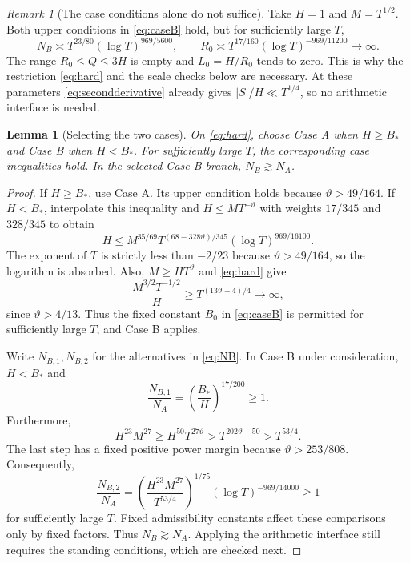 \documentclass[11pt,reqno]{amsart}
\numberwithin{equation}{section}
\newtheorem{lemma}[lemma]{Lemma}
\theoremstyle{definition}
\theoremstyle{remark}
\newtheorem{remark}[remark]{Remark}
\newcommand{\vth}{\vartheta}
\begin{document}
\begin{remark}[The case conditions alone do not suffice]\label{rem:casecounterexample}
Take $H=1$ and $M=T^{1/2}$. Both upper conditions in \eqref{eq:caseB} hold, but for sufficiently large $T$,
\[
 N_B\asymp T^{23/80}(\log T)^{969/5600},\qquad
 R_0\asymp T^{17/160}(\log T)^{-969/11200}\longrightarrow\infty.
\]
The range $R_0\le Q\le3H$ is empty and $L_0=H/R_0$ tends to zero. This is why the restriction \eqref{eq:hard} and the scale checks below are necessary.
At these parameters \eqref{eq:secondderivative} already gives $|S|/H\ll T^{1/4}$, so no arithmetic interface is needed.
\end{remark}

\begin{lemma}[Selecting the two cases]\label{lem:caseselection}
On \eqref{eq:hard}, choose Case A when $H\ge B_*$ and Case B when $H<B_*$. For sufficiently large $T$, the corresponding case inequalities hold. In the selected Case B branch, $N_B\gtrsim N_A$.
\end{lemma}
\begin{proof}
If $H\ge B_*$, use Case A.
Its upper condition holds because $\vth>49/164$.
If $H<B_*$, interpolate this inequality and $H\le MT^{-\vth}$ with weights $17/345$ and $328/345$ to obtain
\begin{equation}\label{eq:caseBinterpolation}
 H\le M^{35/69}T^{(68-328\vth)/345}(\log T)^{969/16100}.
\end{equation}
The exponent of $T$ is strictly less than $-2/23$ because $\vth>49/164$, so the logarithm is absorbed.
Also, $M\ge HT^{\vth}$ and \eqref{eq:hard} give
\begin{equation}\label{eq:B0margin}
 \frac{M^{3/2}T^{-1/2}}H
 \ge T^{(13\vth-4)/4}\longrightarrow\infty,
\end{equation}
since $\vth>4/13$.
Thus the fixed constant $B_0$ in \eqref{eq:caseB} is permitted for sufficiently large $T$, and Case B applies.

Write $N_{B,1},N_{B,2}$ for the alternatives in \eqref{eq:NB}.
In Case B under consideration, $H<B_*$ and
\begin{equation}\label{eq:NB1ratio}
 \frac{N_{B,1}}{N_A}=\left(\frac{B_*}H\right)^{17/200}\ge1.
\end{equation}
Furthermore,
\begin{equation}\label{eq:H23M27}
 H^{23}M^{27}\ge H^{50}T^{27\vth}
 >T^{202\vth-50}>T^{53/4}.
\end{equation}
The last step has a fixed positive power margin because $\vth>253/808$.
Consequently,
\begin{equation}\label{eq:NB2ratio}
 \frac{N_{B,2}}{N_A}
 =\left(\frac{H^{23}M^{27}}{T^{53/4}}\right)^{1/75}
  (\log T)^{-969/14000}\ge1
\end{equation}
for sufficiently large $T$.
Fixed admissibility constants affect these comparisons only by fixed factors.
Thus $N_B\gtrsim N_A$. Applying the arithmetic interface still requires the standing conditions, which are checked next.


\end{proof}
\end{document}
